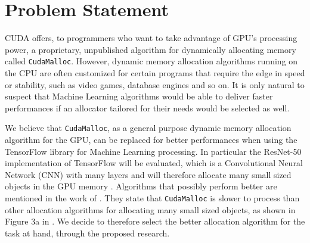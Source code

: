 \documentclass[12pt,twoside]{article}
\begin{document}

\section{Problem Statement}
\label{sec:problem-statement}



CUDA offers, to programmers who want to take advantage of GPU's processing power, a proprietary, unpublished algorithm for dynamically allocating memory called \texttt{CudaMalloc}. However, dynamic memory allocation algorithms running on the CPU are often customized for certain programs that require the edge in speed or stability, such as video games, database engines and so on. It is only natural to suspect that Machine Learning algorithms would be able to deliver faster performances if an allocator tailored for their needs would be selected as well.

We believe that \texttt{CudaMalloc}, as a general purpose dynamic memory allocation algorithm for the GPU, can be replaced for better performances when using the TensorFlow \cite{abadi2016} library for Machine Learning processing. In particular the ResNet-50 implementation of TensorFlow will be evaluated, which is a Convolutional Neural Network (CNN) with many layers and will therefore allocate many small sized objects in the GPU memory \cite{DBLP:HeZRS15}.
Algorithms that possibly perform better are mentioned in the work of \citeauthor{Vinkler2015} \cite{Vinkler2015}. They state that \texttt{CudaMalloc} is slower to process than other allocation algorithms for allocating many small sized objects, as shown in Figure 3a in \cite{Vinkler2015}. We decide to therefore select the better allocation algorithm for the task at hand, through the proposed research.
\end{document}
